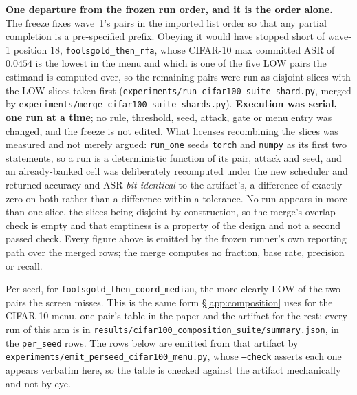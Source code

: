 \documentclass{article}
\begin{document}
\textbf{One departure from the frozen run order, and it is the order alone.} The freeze fixes wave~1's pairs in the imported list order so that any partial completion is a pre-specified prefix. Obeying it would have stopped short of wave-1 position $18$, \texttt{foolsgold\_then\_rfa}, whose CIFAR-10 max committed ASR of $0.0454$ is the lowest in the menu and which is one of the five LOW pairs the estimand is computed over, so the remaining pairs were run as disjoint slices with the LOW slices taken first (\texttt{experiments/\allowbreak run\_cifar100\_suite\_shard.py}, merged by \texttt{experiments/\allowbreak merge\_cifar100\_suite\_shards.py}). \textbf{Execution was serial, one run at a time}; no rule, threshold, seed, attack, gate or menu entry was changed, and the freeze is not edited. What licenses recombining the slices was measured and not merely argued: \texttt{run\_one} seeds \texttt{torch} and \texttt{numpy} as its first two statements, so a run is a deterministic function of its pair, attack and seed, and an already-banked cell was deliberately recomputed under the new scheduler and returned accuracy and ASR \emph{bit-identical} to the artifact's, a difference of exactly zero on both rather than a difference within a tolerance. No run appears in more than one slice, the slices being disjoint by construction, so the merge's overlap check is empty and that emptiness is a property of the design and not a second passed check. Every figure above is emitted by the frozen runner's own reporting path over the merged rows; the merge computes no fraction, base rate, precision or recall.

Per seed, for \texttt{foolsgold\_then\_coord\_median}, the more clearly LOW of the two pairs the screen misses. This is the same form §\ref{app:composition} uses for the CIFAR-10 menu, one pair's table in the paper and the artifact for the rest; every run of this arm is in \texttt{results/\allowbreak cifar100\_\allowbreak composition\_\allowbreak suite/\allowbreak summary.json}, in the \texttt{per\_seed} rows. The rows below are emitted from that artifact by \texttt{experiments/\allowbreak emit\_perseed\_\allowbreak cifar100\_\allowbreak menu.py}, whose \texttt{--check} asserts each one appears verbatim here, so the table is checked against the artifact mechanically and not by eye.
\end{document}
